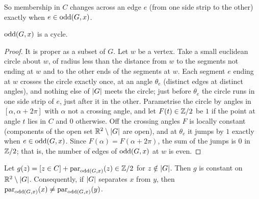 
So membership in $C$ changes across an edge $e$ (from one side strip to the other) exactly when
$e\in\operatorname{odd}(G,x)$.

\begin{lemma}\label{lem:odd-even}
$\operatorname{odd}(G,x)$ is a cycle.
\end{lemma}

\begin{proof}
It is proper as a subset of $G$. Let $w$ be a vertex. Take a small euclidean circle about $w$, of
radius less than the distance from $w$ to the segments not ending at $w$ and to the other ends of
the segments at $w$. Each segment $e$ ending at $w$ crosses the circle exactly once, at an angle
$\theta_e$ (distinct edges at distinct angles), and nothing else of $\lvert G\rvert$ meets the circle; just
before $\theta_e$ the circle runs in one side strip of $e$, just after it in the other. Parametrise
the circle by angles in $[\alpha,\alpha+2\pi]$ with $\alpha$ not a crossing angle, and let
$F(t)\in\mathbb{Z}/2$ be $1$ if the point at angle $t$ lies in $C$ and $0$ otherwise. Off the crossing angles
$F$ is locally constant (components of the open set $\mathbb{R}^2\setminus\lvert G\rvert$ are open), and at $\theta_e$ it
jumps by $1$ exactly when $e\in\operatorname{odd}(G,x)$. Since $F(\alpha)=F(\alpha+2\pi)$, the sum of the jumps is
$0$ in $\mathbb{Z}/2$; that is, the number of edges of $\operatorname{odd}(G,x)$ at $w$ is even.
\end{proof}


\begin{theorem}\label{thm:odd-cycle}
Let $g(z)=[z\in C]+\operatorname{par}_{\operatorname{odd}(G,x)}(z)\in\mathbb{Z}/2$ for $z\notin\lvert G\rvert$. Then $g$ is constant on
$\mathbb{R}^2\setminus\lvert G\rvert$. Consequently, if $\lvert G\rvert$ separates $x$ from $y$, then
$\operatorname{par}_{\operatorname{odd}(G,x)}(x)\neq\operatorname{par}_{\operatorname{odd}(G,x)}(y)$.
\end{theorem}

